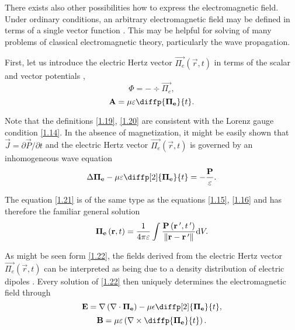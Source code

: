 There exists also other possibilities how to express the electromagnetic field. Under ordinary conditions, an arbitrary electromagnetic field may be defined in terms of a single vector function \cite{Essex1977}. This may be helpful for solving of many problems of classical electromagnetic theory, particularly the wave propagation.

First, let us introduce the electric Hertz vector $ {\vec{\Pi_e}}\left(\vec{r}, t \right) $ in terms of the scalar and vector potentials \cite{Stratton2007},
\begin{equation}
\label{1.19}
\Phi = - \div{\vec{\Pi_e}},
\end{equation}
\begin{equation}
\label{1.20}
\vec{A} = \mu \varepsilon \diffp{\vec{\Pi_e}}{t}.
\end{equation}

Note that the definitions \ref{1.19}, \ref{1.20} are consistent with the Lorenz gauge condition \ref{1.14}. In the absence of magnetization, it might be easily shown that $ \vec{J} = \partial{\vec{P}}/\partial{t} $ and the electric Hertz vector $ {\vec{\Pi_e}}\left(\vec{r}, t \right) $ is governed by an inhomogeneous wave equation
\begin{equation}
\label{1.21}
\laplace{\vec{\Pi_e}} - \mu \varepsilon \diffp[2]{\vec{\Pi_e}}{t} = -\frac{\vec{P}}{\varepsilon}.
\end{equation}

The equation \ref{1.21} is of the same type as the equations \ref{1.15}, \ref{1.16} and has therefore the familiar general solution 
\begin{equation}
\label{1.22}
\mathbf{\Pi_e}\left(\mathbf{r}, t \right) = \frac{1}{4 \pi \varepsilon} \int \frac{\mathbf{P}\left(\mathbf{r^{\: \prime}}, t^{\: \prime} \right)}{\lVert\mathbf{r} - \mathbf{r^{\: \prime}}\rVert} \mathrm{d} V.
\end{equation}

As might be seen form \ref{1.22}, the fields derived from the electric Hertz vector $ {\vec{\Pi_e}}\left(\vec{r}, t \right) $ can be interpreted as being due to a density distribution of electric dipoles \cite{Essex1977}. Every solution of \ref{1.22} then uniquely determines the electromagnetic field through
\begin{equation}
\label{1.23}
\vec{E} = \grad{\left(\div{\vec{\Pi_e}}\right)} - \mu \epsilon \diffp[2]{\vec{\Pi_e}}{t},
\end{equation}
\begin{equation}
\label{1.24}
\vec{B} = \mu \varepsilon \left(\rot{\diffp{\vec{\Pi_e}}{t}}\right).
\end{equation}

